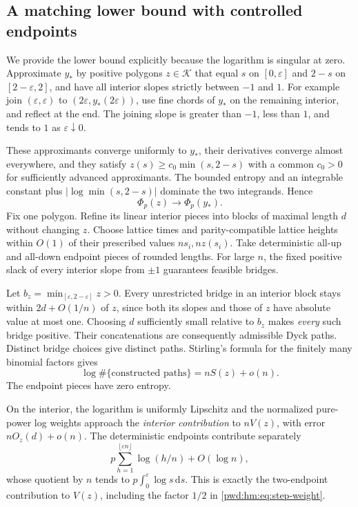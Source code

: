 \documentclass[11pt,letterpaper]{article}
\numberwithin{equation}{section}
\theoremstyle{remark}\newtheorem{remark}[theorem]{Remark}
\newcommand{\K}{\mathcal K}\newcommand{\ee}{\mathrm e}\newcommand{\dd}{\,\mathrm d}
\begin{document}
\subsection{A matching lower bound with controlled endpoints}
We provide the lower bound explicitly because the logarithm is singular at zero. Approximate $y_*$ by positive polygons $z\in\K$ that equal $s$ on $[0,\varepsilon]$ and $2-s$ on $[2-\varepsilon,2]$, and have all interior slopes strictly between $-1$ and $1$. For example join $(\varepsilon,\varepsilon)$ to $(2\varepsilon,y_*(2\varepsilon))$, use fine chords of $y_*$ on the remaining interior, and reflect at the end. The joining slope is greater than $-1$, less than $1$, and tends to $1$ as $\varepsilon\downarrow0$.

These approximants converge uniformly to $y_*$, their derivatives converge almost everywhere, and they satisfy $z(s)\ge c_0\min(s,2-s)$ with a common $c_0>0$ for sufficiently advanced approximants. The bounded entropy and an integrable constant plus $|\log\min(s,2-s)|$ dominate the two integrands. Hence
\begin{equation}\label{pwd:hm:eq:polygon-approx}
 \Phi_p(z)\longrightarrow\Phi_p(y_*).
\end{equation}
Fix one polygon. Refine its linear interior pieces into blocks of maximal length $d$ without changing $z$. Choose lattice times and parity-compatible lattice heights within $O(1)$ of their prescribed values $ns_i,nz(s_i)$. Take deterministic all-up and all-down endpoint pieces of rounded lengths. For large $n$, the fixed positive slack of every interior slope from $\pm1$ guarantees feasible bridges.

Let $b_z=\min_{[\varepsilon,2-\varepsilon]}z>0$. Every unrestricted bridge in an interior block stays within $2d+O(1/n)$ of $z$, since both its slopes and those of $z$ have absolute value at most one. Choosing $d$ sufficiently small relative to $b_z$ makes \emph{every} such bridge positive. Their concatenations are consequently admissible Dyck paths. Distinct bridge choices give distinct paths. Stirling's formula for the finitely many binomial factors gives
\[
 \log\#\{\text{constructed paths}\}=nS(z)+o(n).
\]
The endpoint pieces have zero entropy.

On the interior, the logarithm is uniformly Lipschitz and the normalized pure-power log weights approach the \emph{interior contribution} to $nV(z)$, with error $nO_z(d)+o(n)$. The deterministic endpoints contribute separately
\begin{equation}\label{pwd:hm:eq:endpoint-potential}
 p\sum_{h=1}^{\lfloor\varepsilon n\rfloor}\log(h/n)+O(\log n),
\end{equation}
whose quotient by $n$ tends to $p\int_0^\varepsilon\log s\dd s$. This is exactly the two-endpoint contribution to $V(z)$, including the factor $1/2$ in \eqref{pwd:hm:eq:step-weight}.
\end{document}
